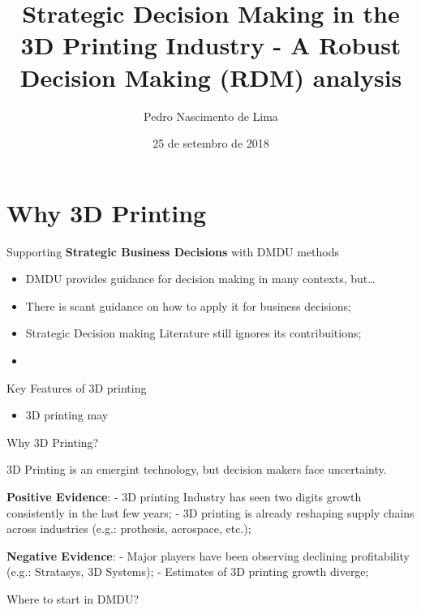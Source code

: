 \documentclass[ignorenonframetext,]{beamer}
\title{Strategic Decision Making in the 3D Printing Industry - A Robust
Decision Making (RDM) analysis}
\author{Pedro Nascimento de Lima}
\date{25 de setembro de 2018}
\providecommand{\tightlist}{%
  \setlength{\itemsep}{0pt}\setlength{\parskip}{0pt}}
\begin{document}
\frame{\titlepage}

\begin{frame}
\tableofcontents[hideallsubsections]
\end{frame}

\section{Why 3D Printing}\label{why-3d-printing}

\begin{frame}{Supporting \textbf{Strategic Business Decisions} with DMDU
methods}

\begin{itemize}
\item
  DMDU provides guidance for decision making in many contexts,
  but\ldots{}
\item
  There is scant guidance on how to apply it for business decisions;
\item
  Strategic Decision making Literature still ignores its contribuitions;
\item
\end{itemize}

\end{frame}

\begin{frame}{Key Features of 3D printing}

\begin{itemize}
\tightlist
\item
  3D printing may
\end{itemize}

\end{frame}

\begin{frame}{Why 3D Printing?}

3D Printing is an emergint technology, but decision makers face
uncertainty.

\textbf{Positive Evidence}: - 3D printing Industry has seen two digits
growth consistently in the last few years; - 3D printing is already
reshaping supply chains across industries (e.g.: prothesis, aerospace,
etc.);

\textbf{Negative Evidence}: - Major players have been observing
declining profitability (e.g.: Stratasys, 3D Systems); - Estimates of 3D
printing growth diverge;

\end{frame}

\begin{frame}{Where to start in DMDU?}

\end{frame}
\end{document}
